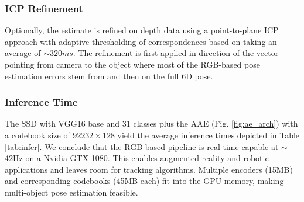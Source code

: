 \subsubsection{ICP Refinement}
\label{sec:icp}
Optionally, the estimate is refined on depth data using a point-to-plane \gls{ICP} approach with adaptive thresholding of correspondences based on \cite{chen1992object, zhang1994iterative} taking an average of $\sim 320ms$. The refinement is first applied in direction of the vector pointing from camera to the object where most of the RGB-based pose estimation errors stem from and then on the full 6D pose.

\subsubsection{Inference Time}
The \gls{SSD} with VGG16 base and 31 classes plus the \gls{AAE} (Fig. \ref{fig:ae_arch}) with a codebook size of $92232 \times 128$ yield the average inference times depicted in Table \ref{tab:infer}. We conclude that the RGB-based pipeline is real-time capable at $\sim$42Hz on a Nvidia GTX 1080. This enables augmented reality and robotic applications and leaves room for tracking algorithms. Multiple encoders (15MB) and corresponding codebooks (45MB each) fit into the GPU memory, making multi-object pose estimation feasible.


